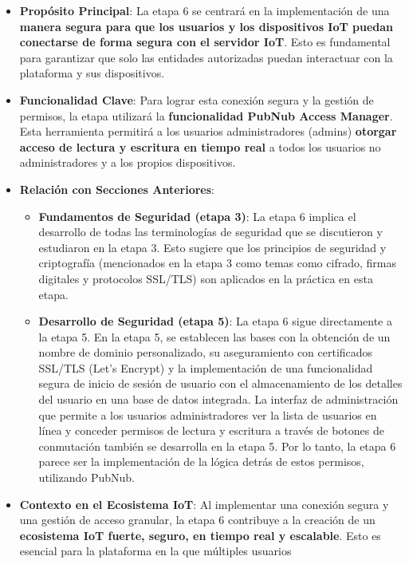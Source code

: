 \documentclass{report}
\begin{document}
\begin{itemize}
    \item \textbf{Propósito Principal}: La etapa 6 se centrará en la implementación de una \textbf{manera segura para que los usuarios y los dispositivos 
    IoT puedan conectarse de forma segura con el servidor IoT}. Esto es fundamental para garantizar que solo las entidades autorizadas puedan interactuar 
    con la plataforma y sus dispositivos.
    \item \textbf{Funcionalidad Clave}: Para lograr esta conexión segura y la gestión de permisos, la etapa utilizará la \textbf{funcionalidad PubNub 
    Access Manager}. Esta herramienta permitirá a los usuarios administradores (admins) \textbf{otorgar acceso de lectura y escritura en tiempo real} a 
    todos los usuarios no administradores y a los propios dispositivos.
    \item \textbf{Relación con Secciones Anteriores}:
    \begin{itemize}
        \item \textbf{Fundamentos de Seguridad (etapa 3)}: La etapa 6 implica el desarrollo de todas las terminologías de seguridad que se discutieron 
        y estudiaron en la etapa 3. Esto sugiere que los principios de seguridad y criptografía (mencionados en la etapa 3 como temas como cifrado, 
        firmas digitales y protocolos SSL/TLS) son aplicados en la práctica en esta etapa.
        \item \textbf{Desarrollo de Seguridad (etapa 5)}: La etapa 6 sigue directamente a la etapa 5. En la etapa 5, se establecen las bases con 
        la obtención de un nombre de dominio personalizado, su aseguramiento con certificados SSL/TLS (Let's Encrypt) y la implementación de una 
        funcionalidad segura de inicio de sesión de usuario con el almacenamiento de los detalles del usuario en una base de datos integrada. 
        La interfaz de administración que permite a los usuarios administradores ver la lista de usuarios en línea y conceder permisos de lectura y 
        escritura a través de botones de conmutación también se desarrolla en la etapa 5. Por lo tanto, la etapa 6 parece ser la implementación 
        de la lógica detrás de estos permisos, utilizando PubNub.
    \end{itemize}
    \item \textbf{Contexto en el Ecosistema IoT}: Al implementar una conexión segura y una gestión de acceso granular, la etapa 6 contribuye a la 
    creación de un \textbf{ecosistema IoT fuerte, seguro, en tiempo real y escalable}. Esto es esencial para la plataforma en la que múltiples usuarios 

\end{itemize}
\end{document}
